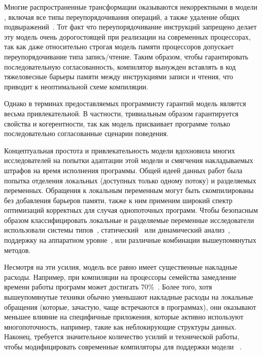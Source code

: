 Многие распространенные трансформации оказываются 
некорректными в модели \SC, включая 
все типы переупорядочивания операций, 
а также удаление общих подвыражений~\cite{Marino-al:PLDI11, Sevcik-Aspinall:ECOOP08}.
Тот факт что переупорядочивание инструкций запрещено 
делает эту модель очень дорогостоящей при реализации
на современных процессорах, так как даже 
относительно строгая модель памяти процессоров \Intel
допускает переупорядочивание типа запись/чтение. 
Таким образом, чтобы гарантировать последовательную согласованность, 
компилятор вынужден вставлять в код тяжеловесные 
барьеры памяти между инструкциями записи и чтения,
что приводит к неоптимальной схеме компиляции. 

Однако в терминах предоставляемых программисту гарантий 
модель \SC является весьма привлекательной. 
В частности, тривиальным образом гарантируется свойства \eDRF и когерентности, 
так как модель присваивает программе только 
последовательно согласованные сценарии поведения. 

Концептуальная простота и привлекательность модели \SC 
вдохновила многих исследователей на попытки 
адаптации этой модели и смягчения накладываемых 
штрафов на время исполнения программы. 
Общей идеей данных работ была попытка 
отделения локальных (доступных только одному потоку) 
и разделяемых переменных.
Обращения к локальным переменным могут быть скомпилированы 
без добавления барьеров памяти, также к ним 
применим широкий спектр оптимизаций корректных 
для случая однопоточных программ. 
Чтобы безопасным образом классифицировать 
локальные и разделяемые переменные исследователи 
использовали системы типов~\cite{Vollmer-al:PPoPP17},
статический~\cite{Singh-al:ISCA12} или динамический анализ~\cite{Liu-al:PLDI19}, 
поддержку на аппаратном уровне~\cite{Singh-al:ISCA12, Marino-al:PLDI10}, 
или различные комбинации вышеупомянутых методов.  

Несмотря на эти усилия, модель \SC все равно имеет существенные накладные расходы. 
Например, при компиляции на процессоры семейства 
замедление времени работы программ может достигать 70\%~\cite{Liu-al:PLDI19}.
Более того, хотя вышеупомянутые техники обычно уменьшают 
накладные расходы на локальные обращения 
(которые, зачастую, чаще встречаются в программах),
они оказывают меньшее влияние на специфичные приложения, 
которые активно используют многопоточность, 
например, такие как неблокирующие структуры данных.
Наконец, требуется значительное количество усилий 
и технической работы, чтобы модифицировать 
современные компиляторы для поддержки модели \SC~\cite{Marino-al:PLDI11, Liu-al:PLDI19}.

